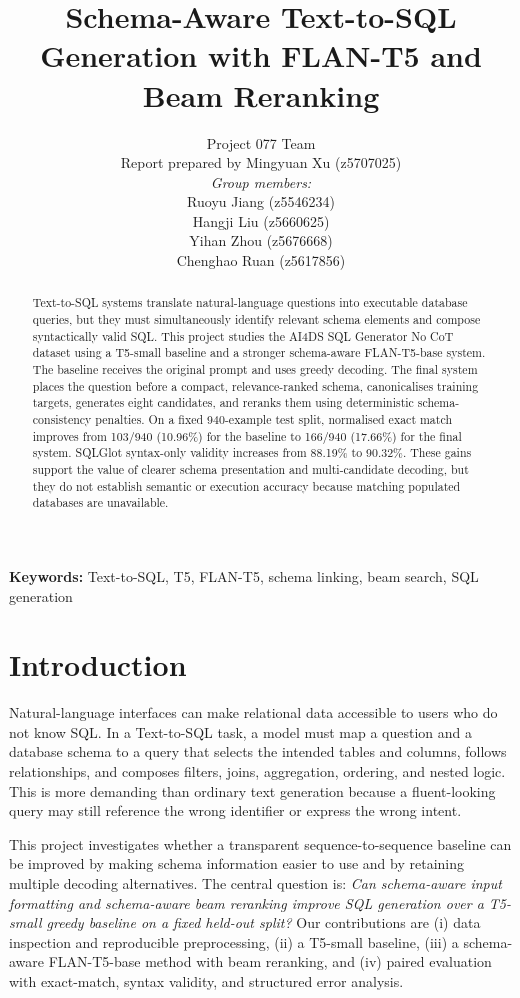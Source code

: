 \documentclass[10pt,a4paper]{article}
\title{Schema-Aware Text-to-SQL Generation with FLAN-T5 and Beam Reranking}
\author{Project 077 Team\\
Report prepared by Mingyuan Xu (z5707025)\\
\textit{Group members:}\\
Ruoyu Jiang (z5546234)\\
Hangji Liu (z5660625)\\
Yihan Zhou (z5676668)\\
Chenghao Ruan (z5617856)}
\date{}
\begin{document}
\maketitle

\begin{abstract}
Text-to-SQL systems translate natural-language questions into executable database queries, but they must simultaneously identify relevant schema elements and compose syntactically valid SQL. This project studies the AI4DS SQL Generator No CoT dataset using a T5-small baseline and a stronger schema-aware FLAN-T5-base system. The baseline receives the original prompt and uses greedy decoding. The final system places the question before a compact, relevance-ranked schema, canonicalises training targets, generates eight candidates, and reranks them using deterministic schema-consistency penalties. On a fixed 940-example test split, normalised exact match improves from 103/940 (10.96\%) for the baseline to 166/940 (17.66\%) for the final system. SQLGlot syntax-only validity increases from 88.19\% to 90.32\%. These gains support the value of clearer schema presentation and multi-candidate decoding, but they do not establish semantic or execution accuracy because matching populated databases are unavailable.
\end{abstract}

\textbf{Keywords:} Text-to-SQL, T5, FLAN-T5, schema linking, beam search, SQL generation

\section{Introduction}
Natural-language interfaces can make relational data accessible to users who do not know SQL. In a Text-to-SQL task, a model must map a question and a database schema to a query that selects the intended tables and columns, follows relationships, and composes filters, joins, aggregation, ordering, and nested logic. This is more demanding than ordinary text generation because a fluent-looking query may still reference the wrong identifier or express the wrong intent.

This project investigates whether a transparent sequence-to-sequence baseline can be improved by making schema information easier to use and by retaining multiple decoding alternatives. The central question is: \emph{Can schema-aware input formatting and schema-aware beam reranking improve SQL generation over a T5-small greedy baseline on a fixed held-out split?} Our contributions are (i) data inspection and reproducible preprocessing, (ii) a T5-small baseline, (iii) a schema-aware FLAN-T5-base method with beam reranking, and (iv) paired evaluation with exact-match, syntax validity, and structured error analysis.
\end{document}
